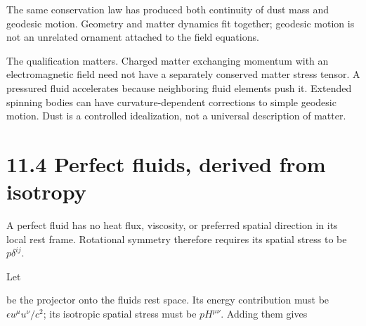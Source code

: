 \documentclass[
  11pt,
  letterpaper,
  oneside,
  openany]{scrbook}
\begin{document}
\begin{center}
\begingroup
{}
\ifdim\wd\grmathbox>\linewidth
\resizebox{\linewidth}{!}{\usebox{\grmathbox}}
\else\usebox{\grmathbox}\fi
\endgroup
\end{center}

The same conservation law has produced both continuity of dust mass and
geodesic motion. Geometry and matter dynamics fit together; geodesic
motion is not an unrelated ornament attached to the field equations.

The qualification matters. Charged matter exchanging momentum with an
electromagnetic field need not have a separately conserved matter stress
tensor. A pressured fluid accelerates because neighboring fluid elements
push it. Extended spinning bodies can have curvature-dependent
corrections to simple geodesic motion. Dust is a controlled
idealization, not a universal description of matter.

\hypertarget{perfect-fluids-derived-from-isotropy}{%
\section{11.4 Perfect fluids, derived from
isotropy}\label{perfect-fluids-derived-from-isotropy}}

A perfect fluid has no heat flux, viscosity, or preferred spatial
direction in its local rest frame. Rotational symmetry therefore
requires its spatial stress to be \(p\delta^{ij}\).

Let

\begin{center}
\begingroup
{}
\ifdim\wd\grmathbox>\linewidth
\resizebox{\linewidth}{!}{\usebox{\grmathbox}}
\else\usebox{\grmathbox}\fi
\endgroup
\end{center}

be the projector onto the fluid\textquotesingle s rest space. Its energy
contribution must be \(\epsilon u^\mu u^\nu/c^2\); its isotropic spatial
stress must be \(pH^{\mu\nu}\). Adding them gives

\begin{center}
\begingroup
{}
\ifdim\wd\grmathbox>\linewidth
\resizebox{\linewidth}{!}{\usebox{\grmathbox}}
\else\usebox{\grmathbox}\fi
\endgroup
\end{center}
\end{document}
